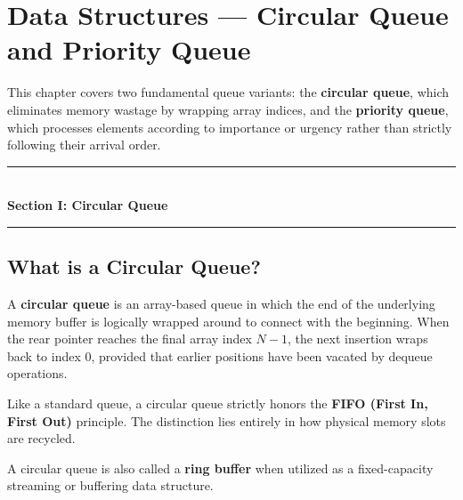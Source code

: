 \chapter{Data Structures --- Circular Queue and Priority Queue}
\label{ch:circular_priority_queue}

This chapter covers two fundamental queue variants: the \textbf{circular queue}, which eliminates memory wastage by wrapping array indices, and the \textbf{priority queue}, which processes elements according to importance or urgency rather than strictly following their arrival order.

\begin{center}
\vspace{0.5em}
{\color{primary}\rule{0.45\textwidth}{1.2pt}}\\[4pt]
{\Large\bfseries\color{primary} Section I: Circular Queue}\\[2pt]
{\color{primary}\rule{0.45\textwidth}{1.2pt}}
\vspace{0.5em}
\end{center}

\section{What is a Circular Queue?}

A \textbf{circular queue} is an array-based queue in which the end of the underlying memory buffer is logically wrapped around to connect with the beginning. When the rear pointer reaches the final array index $N-1$, the next insertion wraps back to index $0$, provided that earlier positions have been vacated by dequeue operations.

Like a standard queue, a circular queue strictly honors the \textbf{FIFO (First In, First Out)} principle. The distinction lies entirely in how physical memory slots are recycled.

A circular queue is also called a \textbf{ring buffer} when utilized as a fixed-capacity streaming or buffering data structure.

